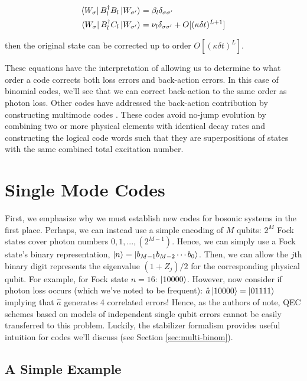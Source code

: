 \documentclass[12]{amsart}
\newcommand\0{\mathbf{0}}
\newcommand\<{\langle}
\renewcommand\>{\rangle}
\begin{document}
\begin{align}
\label{eq:aqec}
\begin{split}
\bra{W_\sigma} B_l^\dag B_l \ket{W_{\sigma'}} &= \beta_l \delta_{\sigma \sigma'} \\
\bra{W_\sigma} B_l^\dag C_l \ket{W_{ \sigma'}} &= \nu_l \delta_{\sigma \sigma'}	+ O[(\kappa \delta t)^{L + 1}]
\end{split}
\end{align}

then the original state can be corrected up to order $O[(\kappa \delta t)^L]$.

These equations have the interpretation of allowing us to determine to what order a code corrects both loss errors and back-action errors. In this case of binomial codes, we'll see that we can correct back-action to the same order as photon loss. Other codes have addressed the back-action contribution by constructing multimode codes \cite{chuang1997bosonic}. These codes avoid no-jump evolution by combining two or more physical elements with identical decay rates and constructing the logical code words such that they are superpositions of states with the same combined total excitation number.

\section{Single Mode Codes}

First, we emphasize why we must establish new codes for bosonic systems in the first place. Perhaps, we can instead use a simple encoding of $M$ qubits: $2^M$ Fock states cover photon numbers $0, 1, . . . , (2^{M - 1})$. Hence, we can simply use a Fock state's binary representation, $\ket{n} = \ket{b_{M-1} b_{M-2} \cdots b_0 }$. Then, we can allow the $j$th binary digit represents the eigenvalue $(1 + Z_j)/2$ for the corresponding physical qubit. For example, for Fock state $n=16$: $\ket{10000}$. However, now consider if photon loss occurs (which we've noted to be frequent): $\hat{a}\ket{10000} = \ket{01111}$ implying that $\hat{a}$ generates 4 correlated errors! Hence, as the authors of \cite{michael2016new} note, QEC schemes based on models of independent single qubit errors cannot be easily transferred to this problem. Luckily, the stabilizer formalism provides useful intuition for codes we'll discuss (see Section \ref{sec:multi-binom}).

\subsection{A Simple Example}
\label{sec:simple}
\end{document}
